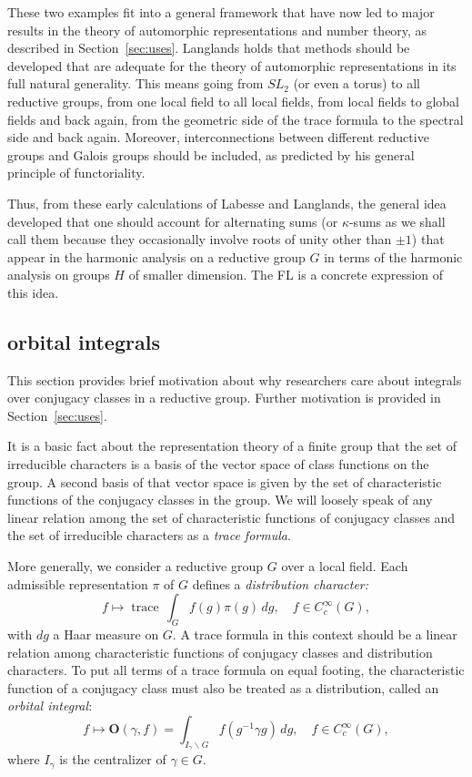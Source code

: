 \documentclass[brochure,english,12pt]{bourbaki}
\theoremstyle{plain}
\def\op#1{{\operatorname{#1}}}
\def\OO{{\mathbf O}}
\begin{document}
These two examples fit into a general framework that have now led to
major results in the theory of automorphic representations and number
theory, as described in Section~\ref{sec:uses}.  Langlands holds that
methods should be developed that are adequate for the theory of
automorphic representations in its full natural generality.  This
means going from $SL_2$ (or even a torus) to all reductive groups,
from one local field to all local fields, from local fields to global
fields and back again, from the geometric side of the trace formula to
the spectral side and back again.  Moreover, interconnections between
different reductive groups and Galois groups should be included, as
predicted by his general principle of functoriality.


Thus, from these early calculations of Labesse and Langlands, the
general idea developed that one should account for alternating sums
(or $\kappa$-sums as we shall call them because they occasionally 
involve roots of unity other than $\pm1$) that appear in the harmonic
analysis on a reductive group $G$ in terms of the harmonic analysis on
groups $H$ of smaller dimension.  The FL is a concrete
expression of this idea.

\subsection{orbital integrals}

This section provides brief motivation about why researchers care
about integrals over conjugacy classes in a reductive group.  Further
motivation is provided in Section~\ref{sec:uses}.

It is a basic fact about the representation theory of a finite group
that the set of irreducible characters is a basis of the vector space
of class functions on the group.  A second basis of that vector space
is given by the set of characteristic functions of the conjugacy
classes in the group.  We will loosely speak of any linear relation
among the set of characteristic functions of conjugacy classes and the
set of irreducible characters as a {\it trace formula}.

More generally, we consider a reductive group $G$ over a local field.
Each admissible representation $\pi$ of $G$ defines a {\it
  distribution character:}
\[
f\mapsto
\op{trace}\,\int_G f(g)\pi(g)\,dg,\quad  f\in C_c^\infty(G),
\]
with $dg$  a Haar measure on $G$.
A trace formula in this context should be a linear
relation among characteristic functions of conjugacy classes and
distribution characters.  To put all terms of a trace formula on equal
footing, the characteristic function of a conjugacy class must also be
treated as a distribution, called an {\it orbital integral}:
\[
f\mapsto \OO(\gamma,f) = \int_{I_\gamma\backslash G} f(g^{-1}\gamma g)\, dg,\quad f\in C_c^\infty(G),
\]
where $I_\gamma$ is the centralizer of $\gamma\in G$.
\end{document}
